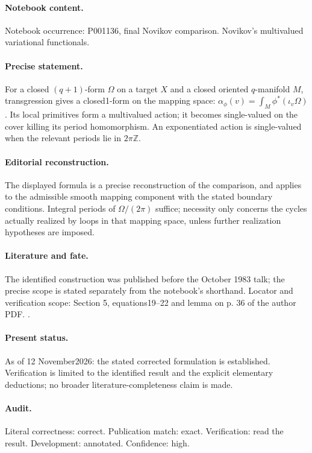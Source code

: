 \paragraph{Notebook content.} Notebook occurrence: P001136, final Novikov comparison. Novikov's multivalued variational functionals.

\paragraph{Precise statement.} For a closed \((q+1)\)-form \(\Omega\) on a target \(X\) and a closed oriented \(q\)-manifold \(M\), transgression gives a closed1-form on the mapping space: \(\alpha_\phi(v)=\int_M\phi^*(\iota_v\Omega)\). Its local primitives form a multivalued action; it becomes single-valued on the cover killing its period homomorphism. An exponentiated action is single-valued when the relevant periods lie in \(2\pi\mathbb Z\).

\paragraph{Editorial reconstruction.} The displayed formula is a precise reconstruction of the comparison, and applies to the admissible smooth mapping component with the stated boundary conditions. Integral periods of \(\Omega/(2\pi)\) suffice; necessity only concerns the cycles actually realized by loops in that mapping space, unless further realization hypotheses are imposed.

\paragraph{Literature and fate.} The identified construction was published before the October 1983 talk; the precise scope is stated separately from the notebook's shorthand. Locator and verification scope: Section 5, equations19--22 and lemma on p. 36 of the author PDF. \cite{novikov1982hamiltonian}.

\paragraph{Present status.} As of 12 November2026: the stated corrected formulation is established. Verification is limited to the identified result and the explicit elementary deductions; no broader literature-completeness claim is made.

\paragraph{Audit.} Literal correctness: correct. Publication match: exact. Verification: read the result. Development: annotated. Confidence: high.

